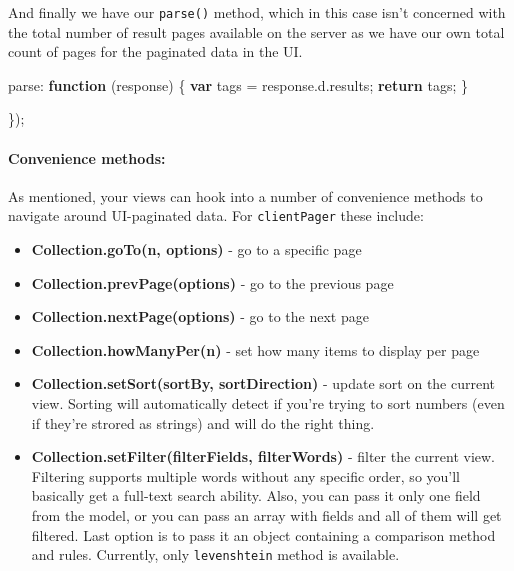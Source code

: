\documentclass[9pt]{book}
\newenvironment{Shaded}{}{}
\newcommand{\KeywordTok}[1]{\textcolor[rgb]{0.00,0.44,0.13}{\textbf{{#1}}}}
\newcommand{\OtherTok}[1]{\textcolor[rgb]{0.00,0.44,0.13}{{#1}}}
\newcommand{\FunctionTok}[1]{\textcolor[rgb]{0.02,0.16,0.49}{{#1}}}
\newcommand{\NormalTok}[1]{{#1}}
\begin{document}
And finally we have our \texttt{parse()} method, which in this case
isn't concerned with the total number of result pages available on the
server as we have our own total count of pages for the paginated data in
the UI.

\begin{Shaded}
\begin{Highlighting}[]
    \NormalTok{parse: }\KeywordTok{function} \NormalTok{(response) \{}
            \KeywordTok{var} \NormalTok{tags = }\OtherTok{response}\NormalTok{.}\OtherTok{d}\NormalTok{.}\FunctionTok{results}\NormalTok{;}
            \KeywordTok{return} \NormalTok{tags;}
        \NormalTok{\}}

    \NormalTok{\});}
\end{Highlighting}
\end{Shaded}

\paragraph{Convenience methods:}\label{convenience-methods-1}

As mentioned, your views can hook into a number of convenience methods
to navigate around UI-paginated data. For \texttt{clientPager} these
include:

\begin{itemize}
\itemsep1pt\parskip0pt
\item
  \textbf{Collection.goTo(n, options)} - go to a specific page
\item
  \textbf{Collection.prevPage(options)} - go to the previous page
\item
  \textbf{Collection.nextPage(options)} - go to the next page
\item
  \textbf{Collection.howManyPer(n)} - set how many items to display per
  page
\item
  \textbf{Collection.setSort(sortBy, sortDirection)} - update sort on
  the current view. Sorting will automatically detect if you're trying
  to sort numbers (even if they're strored as strings) and will do the
  right thing.
\item
  \textbf{Collection.setFilter(filterFields, filterWords)} - filter the
  current view. Filtering supports multiple words without any specific
  order, so you'll basically get a full-text search ability. Also, you
  can pass it only one field from the model, or you can pass an array
  with fields and all of them will get filtered. Last option is to pass
  it an object containing a comparison method and rules. Currently, only
  \texttt{levenshtein} method is available.
\end{itemize}
\end{document}

